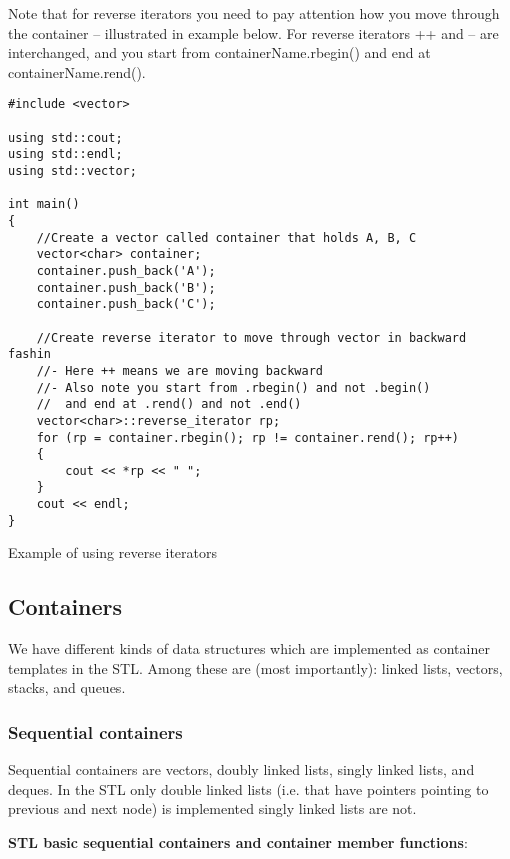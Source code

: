 Note that for reverse iterators you need to pay attention how you move through the container --
illustrated in example below. For reverse iterators ++ and -- are interchanged, and you start from
containerName.rbegin() and end at containerName.rend().

\begin{listing}[H]
\begin{verbatim}
#include <vector>

using std::cout;
using std::endl;
using std::vector;

int main()
{
	//Create a vector called container that holds A, B, C
	vector<char> container;
	container.push_back('A');
	container.push_back('B');
	container.push_back('C');
	
	//Create reverse iterator to move through vector in backward fashin
	//- Here ++ means we are moving backward
	//- Also note you start from .rbegin() and not .begin()
	//  and end at .rend() and not .end()
	vector<char>::reverse_iterator rp;
	for (rp = container.rbegin(); rp != container.rend(); rp++)
	{
		cout << *rp << " ";
	}
	cout << endl;
}
\end{verbatim}
\caption{Example of using reverse iterators}
\label{source_code_1}
\end{listing}





\subsection{Containers}
We have different kinds of data structures which are implemented as container templates in the
STL. Among these are (most importantly): linked lists, vectors, stacks, and queues.

\subsubsection{Sequential containers}
Sequential containers are vectors, doubly linked lists, singly linked lists, and deques. In the STL
only double linked lists (i.e. that have pointers pointing to previous and next node) is implemented
singly linked lists are not.

\noindent
\textbf{STL basic sequential containers and container member functions}:

